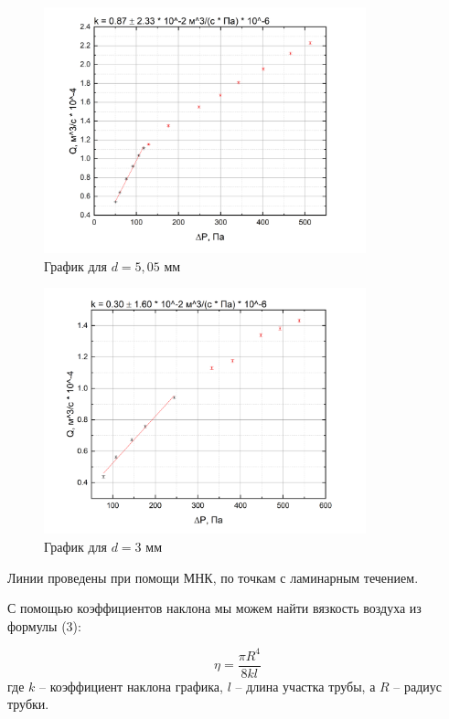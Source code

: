 \documentclass[a4paper, 12pt]{article}
\begin{document}
\begin{figure}[!ht]
    \centering
    \includegraphics[width=0.83\textwidth]{G2.jpg}
    \caption{График для $d = 5,05$ мм}
\end{figure}

\begin{figure}[!ht]
    \centering
    \includegraphics[width=0.83\textwidth]{G3.jpg}
    \caption{График для $d = 3$ мм}
\end{figure}

Линии проведены при помощи МНК, по точкам с ламинарным течением.
	
	С помощью коэффициентов наклона мы можем найти вязкость воздуха из формулы (3):
	
	\begin{equation*}
		\eta = \frac{\pi R^4}{8kl}
	\end{equation*}
	где $k$ -- коэффициент наклона графика, $l$ -- длина участка трубы, а $R$ -- радиус трубки.
	
\end{document}
